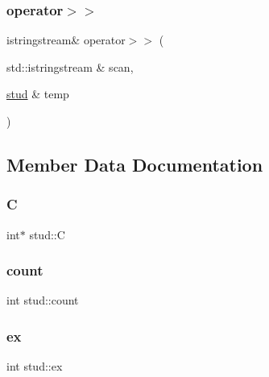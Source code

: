 \mbox{\label{structstud_a73fb6f7d894b3c6bd63ce5543751ee96}} 
\subsubsection{\texorpdfstring{operator$>$$>$}{operator>>}}
{\footnotesize\ttfamily istringstream\& operator$>$$>$ (\begin{DoxyParamCaption}\item[{std\+::istringstream \&}]{scan,  }\item[{\mbox{\hyperlink{structstud}{stud}} \&}]{temp }\end{DoxyParamCaption})\hspace{0.3cm}{\ttfamily [friend]}}



\subsection{Member Data Documentation}
\mbox{\label{structstud_a96d2a21c547c2ce0edd2227591a8a2b8}} 
\subsubsection{\texorpdfstring{C}{C}}
{\footnotesize\ttfamily int$\ast$ stud\+::C}

\mbox{\label{structstud_a33f28b7764f314a65c5fb578e8932c13}} 
\subsubsection{\texorpdfstring{count}{count}}
{\footnotesize\ttfamily int stud\+::count}

\mbox{\label{structstud_afa999423735c9497192e041f81d5988b}} 
\subsubsection{\texorpdfstring{ex}{ex}}
{\footnotesize\ttfamily int stud\+::ex}

\mbox{\label{structstud_a6dc0a9d719c909a26b622e79852e5ed3}} 
